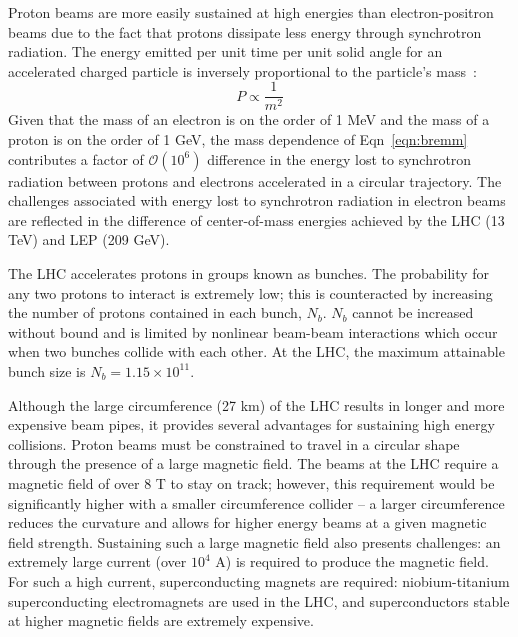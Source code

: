 Proton beams are more easily sustained at high energies than electron-positron beams due to the fact that protons dissipate less energy through synchrotron radiation.
The energy emitted per unit time per unit solid angle for an accelerated charged particle is inversely proportional to the particle's mass~\cite{Jackson:100964}:
\begin{equation}
    P \propto \frac{1}{m^2}
    \label{eqn:bremm}
\end{equation}
Given that the mass of an electron is on the order of 1 MeV and the mass of a proton is on the order of 1 GeV, the mass dependence of Eqn~\ref{eqn:bremm} contributes a factor of $\mathcal O(10^6)$ difference in the energy lost to synchrotron radiation between protons and electrons accelerated in a circular trajectory.
The challenges associated with energy lost to synchrotron radiation in electron beams are reflected in the difference of center-of-mass energies achieved by the LHC (13 TeV) and LEP (209 GeV).

The LHC accelerates protons in groups known as bunches. The probability for any two protons to interact is extremely low; this is counteracted by increasing the number of protons contained in each bunch, $N_b$.
$N_b$ cannot be increased without bound and is limited by nonlinear beam-beam interactions which occur when two bunches collide with each other.
At the LHC, the maximum attainable bunch size is $N_b = 1.15 \times 10^{11}$.

Although the large circumference (27 km) of the LHC results in longer and more expensive beam pipes, it provides several advantages for sustaining high energy collisions.
Proton beams must be constrained to travel in a circular shape through the presence of a large magnetic field.
The beams at the LHC require a magnetic field of over 8 T to stay on track; however, this requirement would be significantly higher with a smaller circumference collider -- a larger circumference reduces the curvature and allows for higher energy beams at a given magnetic field strength.
Sustaining such a large magnetic field also presents challenges: an extremely large current (over $10^4$ A) is required to produce the magnetic field.
For such a high current, superconducting magnets are required: niobium-titanium superconducting electromagnets are used in the LHC, and superconductors stable at higher magnetic fields are extremely expensive. 

